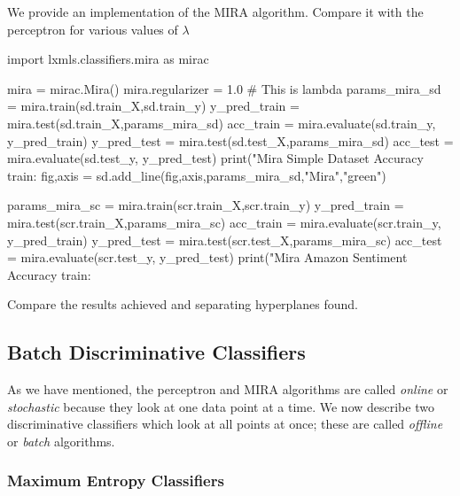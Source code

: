 \begin{exercise}
We provide an implementation of the MIRA algorithm. Compare it with the
perceptron for various values of $\lambda$ 
\begin{python}
import lxmls.classifiers.mira as mirac

mira = mirac.Mira()
mira.regularizer = 1.0 # This is lambda
params_mira_sd = mira.train(sd.train_X,sd.train_y)
y_pred_train = mira.test(sd.train_X,params_mira_sd)
acc_train = mira.evaluate(sd.train_y, y_pred_train)
y_pred_test = mira.test(sd.test_X,params_mira_sd)
acc_test = mira.evaluate(sd.test_y, y_pred_test)
print("Mira Simple Dataset Accuracy train: %
fig,axis = sd.add_line(fig,axis,params_mira_sd,"Mira","green")

params_mira_sc = mira.train(scr.train_X,scr.train_y)
y_pred_train = mira.test(scr.train_X,params_mira_sc)
acc_train = mira.evaluate(scr.train_y, y_pred_train)
y_pred_test = mira.test(scr.test_X,params_mira_sc)
acc_test = mira.evaluate(scr.test_y, y_pred_test)
print("Mira Amazon Sentiment Accuracy train: %
\end{python}
  
Compare the
results achieved and separating hyperplanes found.
\end{exercise}



\subsection{Batch Discriminative Classifiers}

As we have mentioned, the perceptron and MIRA algorithms are called \emph{online} or \emph{stochastic} because they look at one data point at a time. We now describe two discriminative classifiers which look at all points at once; these are called \emph{offline} or \emph{batch} algorithms.

\subsubsection{\label{s:me}Maximum Entropy Classifiers}

